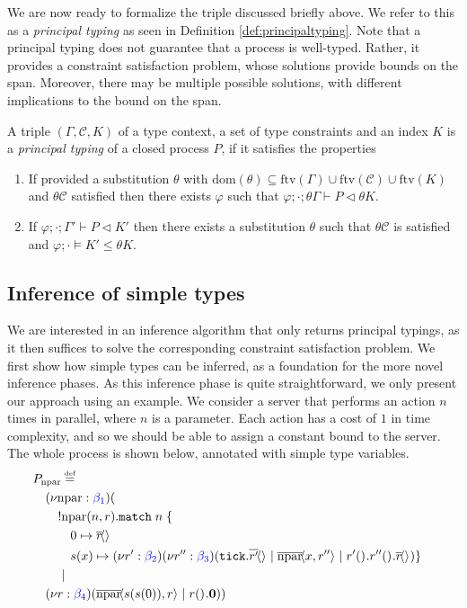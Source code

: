 %
We are now ready to formalize the triple discussed briefly above. We refer to this as a \textit{principal typing} as seen in Definition \ref{def:principaltyping}. Note that a principal typing does not guarantee that a process is well-typed. Rather, it provides a constraint satisfaction problem, whose solutions provide bounds on the span. Moreover, there may be multiple possible solutions, with different implications to the bound on the span.

\begin{definition}\label{def:principaltyping}
A triple $(\Gamma,\mathcal{C},K)$ of a type context, a set of type constraints and an index $K$ is a \textit{principal typing} of a closed process $P$, if it satisfies the properties
\begin{enumerate}
    \item If provided a substitution $\theta$ with $\text{dom}(\theta) \subseteq \text{ftv}(\Gamma) \cup \text{ftv}(\mathcal{C}) \cup \text{ftv}(K)$ and $\theta\mathcal{C}$ satisfied then there exists $\varphi$ such that $\varphi;\cdot;\theta\Gamma\vdash P \triangleleft \theta K$.
    \item If $\varphi;\cdot;\Gamma'\vdash P \triangleleft K'$ then there exists a substitution $\theta$ such that $\theta\mathcal{C}$ is satisfied and $\varphi;\cdot\vDash K' \leq \theta K$.
\end{enumerate}
\end{definition}
\subsection{Inference of simple types}\label{sec:simpletypeinf}
We are interested in an inference algorithm that only returns principal typings, as it then suffices to solve the corresponding constraint satisfaction problem. We first show how simple types can be inferred, as a foundation for the more novel inference phases. As this inference phase is quite straightforward, we only present our approach using an example. We consider a server that performs an action $n$ times in parallel, where $n$ is a parameter. Each action has a cost of $1$ in time complexity, and so we should be able to assign a constant bound to the server. The whole process is shown below, annotated with simple type variables.
\begin{align*}
    &\kern-1em P_{\text{npar}} \defeq\\
    &(\nu \text{npar} : {\color{blue} \beta_1})(\\
    &\kern1em !\text{npar}(n,r).\texttt{match}\; n\; \{\\
    &\kern2em 0 \mapsto \asyncoutputch{r}{}{}\\
    &\kern2em s(x) \mapsto (\nu r' : {\color{blue} \beta_2})(\nu r'' : {\color{blue} \beta_3})(\tick{\asyncoutputch{r'}{}{}} \mid
 \asyncoutputch{\text{npar}}{x,r''}{} \mid \inputch{r'}{}{}{\inputch{r''}{}{}{\asyncoutputch{r}{}{}}}) \} \\
    &\kern1em \mid \\
    &(\nu r : {\color{blue} \beta_4})( \asyncoutputch{\text{npar}}{s(s(0)),r}{} \mid \inputch{r}{}{}{\nil} ))
\end{align*}

